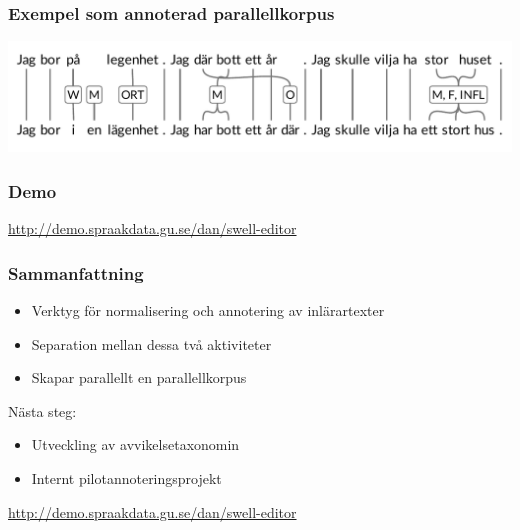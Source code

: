 \documentclass[ignorenonframetext,]{beamer}
\begin{document}
\begin{frame}
\frametitle{Exempel som annoterad parallellkorpus}
\includegraphics[width=\textwidth]{labelled_ladder_black.pdf}
\end{frame}

\begin{frame}[fragile]
\frametitle{Demo}
\begin{center}
\url{http://demo.spraakdata.gu.se/dan/swell-editor}
\end{center}
\end{frame}

\begin{frame}
\frametitle{Sammanfattning}
\begin{itemize}
\item Verktyg för normalisering och annotering av inlärartexter
\item Separation mellan dessa två aktiviteter
\item Skapar parallellt en parallellkorpus
\end{itemize}
\vspace{1cm}
Nästa steg:
\begin{itemize}
\item Utveckling av avvikelsetaxonomin
\item Internt pilotannoteringsprojekt
\end{itemize}
\vspace{1cm}
\url{http://demo.spraakdata.gu.se/dan/swell-editor}
\end{frame}
\end{document}
